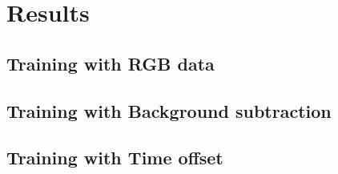 \chapter{Results}
\label{ch:results}


\section{Training with RGB data}

\section{Training with Background subtraction}

\section{Training with Time offset}
